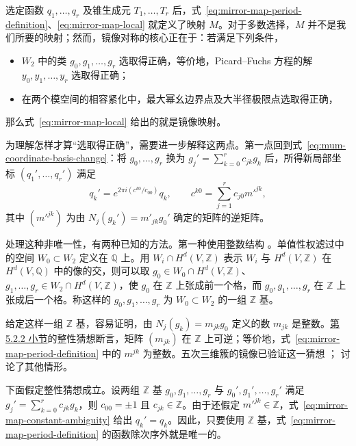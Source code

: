 选定函数 $q_1,\ldots,q_r$ 及锥生成元 $T_1,\ldots,T_r$ 后，式~\eqref{eq:mirror-map-period-definition}、\eqref{eq:mirror-map-local} 就定义了映射 $M$。对于多数选择，$M$ 并不是我们所要的映射；然而，镜像对称的核心正在于：若满足下列条件，
\begin{itemize}
\item $W_2$ 中的类 $g_0,g_1,\ldots,g_r$ 选取得正确，等价地，Picard--Fuchs 方程的解 $y_0,y_1,\ldots,y_r$ 选取得正确；
\item 在两个模空间的相容紧化中，最大幂幺边界点及大半径极限点选取得正确，
\end{itemize}
那么式~\eqref{eq:mirror-map-local} 给出的就是镜像映射。

为理解怎样才算“选取得正确”，需要进一步解释这两点。第一点回到式~\eqref{eq:mum-coordinate-basis-change}：将 $g_0,\ldots,g_r$ 换为 $g_j'=\sum_{k=0}^rc_{jk}g_k$ 后，所得新局部坐标 $(q_1',\ldots,q_r')$ 满足
\begin{equation}\label{eq:mirror-map-constant-ambiguity}
q_k'=e^{2\pi i(c^{k0}/c_{00})}q_k,\qquad
c^{k0}=\sum_{j=1}^rc_{j0}m'^{jk},
\end{equation}
其中 $(m'^{jk})$ 为由 $N_j(g_k')=m'_{jk}g_0'$ 确定的矩阵的逆矩阵。

处理这种非唯一性，有两种已知的方法。第一种使用整数结构 。单值性权滤过中的空间 $W_0\subset W_2$ 定义在 $\mathbb Q$ 上。用 $W_i\cap H^d(V,\mathbb Z)$ 表示 $W_i$ 与 $H^d(V,\mathbb Z)$ 在 $H^d(V,\mathbb Q)$ 中的像的交，则可以取
$g_0\in W_0\cap H^d(V,\mathbb Z)$、$g_1,\ldots,g_r\in W_2\cap H^d(V,\mathbb Z)$，使 $g_0$ 在 $\mathbb Z$ 上张成前一个格，而 $g_0,g_1,\ldots,g_r$ 在 $\mathbb Z$ 上张成后一个格。称这样的 $g_0,g_1,\ldots,g_r$ 为 $W_0\subset W_2$ 的一组 $\mathbb Z$ 基。

给定这样一组 $\mathbb Z$ 基，容易证明，由 $N_j(g_k)=m_{jk}g_0$ 定义的数 $m_{jk}$ 是整数。\hyperref[subsec:higher-dimensional-mum]{第 5.2.2 小节}的整性猜想断言，矩阵 $(m_{jk})$ 在 $\mathbb Z$ 上可逆；等价地，式~\eqref{eq:mirror-map-period-definition} 中的 $m^{jk}$ 为整数。五次三维簇的镜像已验证这一猜想 ； 讨论了其他情形。

下面假定整性猜想成立。设两组 $\mathbb Z$ 基 $g_0,g_1,\ldots,g_r$ 与 $g_0',g_1',\ldots,g_r'$ 满足 $g_j'=\sum_{k=0}^rc_{jk}g_k$，则 $c_{00}=\pm1$ 且 $c_{jk}\in\mathbb Z$。由于还假定 $m'^{jk}\in\mathbb Z$，式~\eqref{eq:mirror-map-constant-ambiguity} 给出 $q_k'=q_k$。因此，只要使用 $\mathbb Z$ 基，式~\eqref{eq:mirror-map-period-definition} 的函数除次序外就是唯一的。

